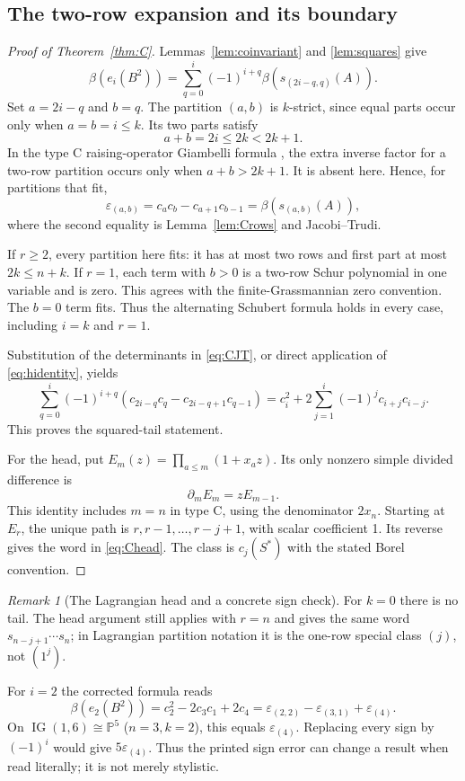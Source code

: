 \documentclass[11pt,letterpaper]{article}
\theoremstyle{remark}
\newtheorem{remark}[theorem]{Remark}
\newcommand{\eps}{\varepsilon}
\newcommand{\IG}{\operatorname{IG}}
\begin{document}
\subsection{The two-row expansion and its boundary}
\begin{proof}[Proof of Theorem~\ref{thm:C}]
Lemmas~\ref{lem:coinvariant} and \ref{lem:squares} give
\[
 \beta(e_i(B^2))
 =\sum_{q=0}^{i}(-1)^{i+q}\beta(s_{(2i-q,q)}(A)).
\]
Set $a=2i-q$ and $b=q$. The partition $(a,b)$ is $k$-strict, since equal parts occur only when $a=b=i\leq k$. Its two parts satisfy
\[
 a+b=2i\leq2k<2k+1.
\]
In the type C raising-operator Giambelli formula \cite[Theorem 1]{BKTisotropic}, the extra inverse factor for a two-row partition occurs only when $a+b>2k+1$. It is absent here. Hence, for partitions that fit,
\begin{equation}
 \eps_{(a,b)}=c_a c_b-c_{a+1}c_{b-1}
                =\beta(s_{(a,b)}(A)),
 \label{eq:CJT}
\end{equation}
where the second equality is Lemma~\ref{lem:Crows} and Jacobi--Trudi.

If $r\geq2$, every partition here fits: it has at most two rows and first part at most $2k\leq n+k$. If $r=1$, each term with $b>0$ is a two-row Schur polynomial in one variable and is zero. This agrees with the finite-Grassmannian zero convention. The $b=0$ term fits. Thus the alternating Schubert formula holds in every case, including $i=k$ and $r=1$.

Substitution of the determinants in \eqref{eq:CJT}, or direct application of \eqref{eq:hidentity}, yields
\[
 \sum_{q=0}^{i}(-1)^{i+q}
       (c_{2i-q}c_q-c_{2i-q+1}c_{q-1})
 =c_i^2+2\sum_{j=1}^{i}(-1)^j c_{i+j}c_{i-j}.
\]
This proves the squared-tail statement.

For the head, put $E_m(z)=\prod_{a\leq m}(1+x_a z)$. Its only nonzero simple divided difference is
\[
 \partial_mE_m=zE_{m-1}.
\]
This identity includes $m=n$ in type C, using the denominator $2x_n$. Starting at $E_r$, the unique path is $r,r-1,\ldots,r-j+1$, with scalar coefficient 1. Its reverse gives the word in \eqref{eq:Chead}. The class is $c_j(S^*)$ with the stated Borel convention.
\end{proof}

\begin{remark}[The Lagrangian head and a concrete sign check]
For $k=0$ there is no tail. The head argument still applies with $r=n$ and gives the same word $s_{n-j+1}\cdots s_n$; in Lagrangian partition notation it is the one-row special class $(j)$, not $(1^j)$.

For $i=2$ the corrected formula reads
\[
 \beta(e_2(B^2))=c_2^2-2c_3c_1+2c_4
 =\eps_{(2,2)}-\eps_{(3,1)}+\eps_{(4)}.
\]
On $\IG(1,6)\cong\mathbb P^5$ ($n=3,k=2$), this equals $\eps_{(4)}$. Replacing every sign by $(-1)^i$ would give $5\eps_{(4)}$. Thus the printed sign error can change a result when read literally; it is not merely stylistic.
\end{remark}
\end{document}
